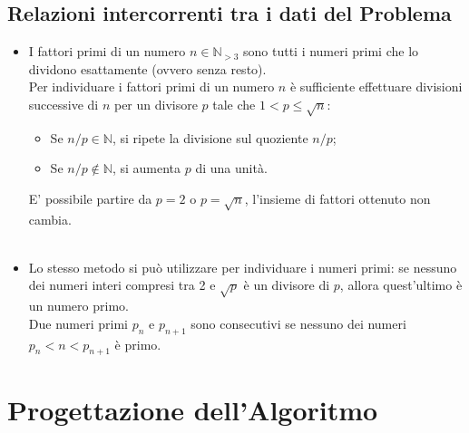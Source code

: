 \documentclass[10pt]{report}
\begin{document}
\subsection{Relazioni intercorrenti tra i dati del Problema}
\begin{itemize}
    \item I fattori primi di un numero $n \in \mathbb{N}_{>3}$ sono tutti i numeri primi che lo dividono esattamente (ovvero senza resto).\\
    Per individuare i fattori primi di un numero $n$ è sufficiente effettuare
    divisioni successive di $n$ per un divisore $p$ tale che $1<p\le\sqrt{n}$:
    \begin{itemize}
        \item Se $n/p \in \mathbb{N}$, si ripete la divisione sul quoziente $n/p$;
        \item Se $n/p \notin \mathbb{N}$, si aumenta $p$ di una unità.
    \end{itemize}
    E' possibile partire da $p=2$ o $p=\sqrt{n}$, l'insieme di fattori ottenuto non cambia.
    \\
    \\
    \item Lo stesso metodo si può utilizzare per individuare i numeri primi: se nessuno dei numeri interi compresi tra 2 e $\sqrt{p}$ è un divisore di $p$, allora quest'ultimo è un numero primo.\\
    Due numeri primi $p_n$ e $p_{n+1}$ sono consecutivi se nessuno dei numeri $p_n<n<p_{n+1}$ è primo. 
    \end{itemize}

\newpage


\section{Progettazione dell'Algoritmo}
\end{document}
